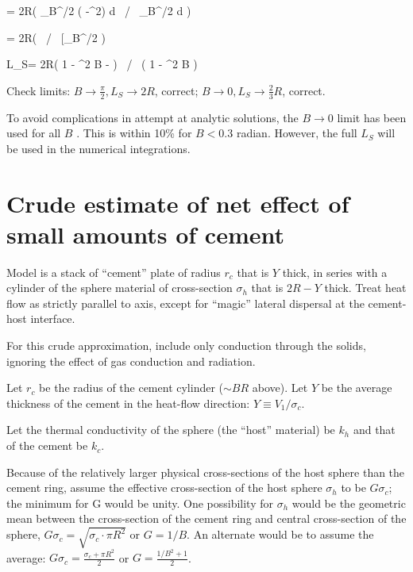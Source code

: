 \documentclass{article}
\begin{document}
\qb = 2R\left(  \int_B^{\pi/2} \left( \sin\theta \cos\theta -\sin\theta \cos^2\theta \right) d \theta
  \ / \  \int_B^{\pi/2} \sin\theta \cos\theta d \theta \right) \qe

\qb = 2R\left(  
  \ / \ \bigg[_B^{\pi/2}    \right) \qe

\qbn L_S= 2R\left( 1 - \sin^2 B -    \right) 
 \ / \ \left( 1 - \sin^2 B  \right)  \qen

Check limits: $B \rightarrow \frac{\pi}{2}, L_S \rightarrow 2R $, correct; 
$B \rightarrow 0, L_S \rightarrow  \frac{2}{3}R $, correct. 

To avoid complications in attempt at analytic solutions, the $B \rightarrow 0$
limit has been used for all $B$ . This is within 10\% for $B<0.3$
radian. However, the full $L_S$ will be used in the numerical integrations.

\section{Crude estimate of net effect of small amounts of cement \label{sec:crd}} %

Model is a stack of ``cement'' plate of radius $r_c$ that is $Y$ thick, in
series with a cylinder of the sphere material of cross-section $\sigma_h$ that
is $2R-Y$ thick. Treat heat flow as strictly parallel to axis, except for
``magic'' lateral dispersal at the cement-host interface.

 For this crude approximation, include only conduction through the solids,
 ignoring the effect of gas conduction and radiation.

 Let $r_c$ be the radius of the cement cylinder ($\sim BR$ above).
 Let $Y$ be the average thickness of the cement in the heat-flow direction: 
$Y \equiv V_1/\sigma_c $.

 Let the thermal conductivity of the sphere (the ``host'' material) be $k_h$ and
 that of the cement be $k_c$.

Because of the relatively larger physical cross-sections of the host sphere than
the cement ring, assume the effective cross-section of the host sphere
$\sigma_h$ to be $G \sigma_c$; the minimum for G would be unity. One possibility
for $\sigma_h$ would be the geometric mean between the cross-section of the
cement ring and central cross-section of the sphere, 
$ G\sigma_c=\sqrt{\sigma_c \cdot \pi R^2 }$ or $G=1/B$. 
An alternate would be to assume the average: 
$G \sigma_c=\frac{ \sigma_c +\pi R^2 }{ 2 }$ or $G=\frac{1/B^2+1}{2}$.
\end{document}
